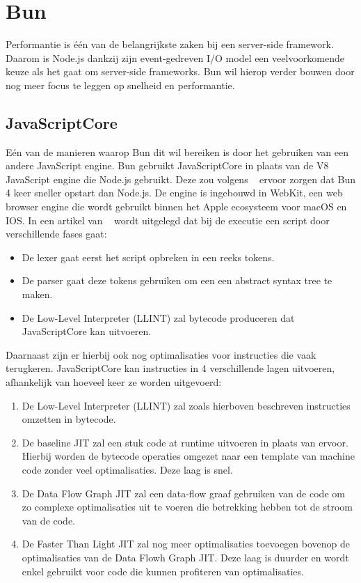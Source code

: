 \section{Bun}
Performantie is één van de belangrijkste zaken bij een server-side framework. 
Daarom is Node.js dankzij zijn event-gedreven I/O model een veelvoorkomende keuze als het gaat om server-side frameworks.
Bun wil hierop verder bouwen door nog meer focus te leggen op snelheid en performantie.


\subsection{JavaScriptCore}
Eén van de manieren waarop Bun dit wil bereiken is door het gebruiken van een andere JavaScript engine.
Bun gebruikt JavaScriptCore in plaats van de V8 JavaScript engine die Node.js gebruikt. 
Deze zou volgens ~\textcite{McDonnel2023} ervoor zorgen dat Bun 4 keer sneller opstart dan Node.js. 
De engine is ingebouwd in WebKit, een web browser engine die wordt gebruikt binnen het Apple ecosysteem voor macOS en IOS.
In een artikel van ~\textcite{Pizlo2020} wordt uitgelegd dat bij de executie een script door verschillende fases gaat:
\begin{itemize}
    \item De lexer gaat eerst het script opbreken in een reeks tokens.
    \item De parser gaat deze tokens gebruiken om een een abstract syntax tree te maken.
    \item De Low-Level Interpreter (LLINT) zal bytecode produceren dat JavaScriptCore kan uitvoeren.
\end{itemize}
Daarnaast zijn er hierbij ook nog optimalisaties voor instructies die vaak terugkeren. 
JavaScriptCore kan instructies in 4 verschillende lagen uitvoeren, afhankelijk van hoeveel keer ze worden uitgevoerd:
\begin{enumerate}
    \item De Low-Level Interpreter (LLINT) zal zoals hierboven beschreven instructies omzetten in bytecode.
    \item De baseline JIT zal een stuk code at runtime uitvoeren in plaats van ervoor. 
    Hierbij worden de bytecode operaties omgezet naar een template van machine code zonder veel optimalisaties. Deze laag is snel.
    \item De Data Flow Graph JIT zal een data-flow graaf gebruiken van de code om zo complexe optimalisaties uit te voeren die betrekking hebben tot de stroom van de code.
    \item De Faster Than Light JIT zal nog meer optimalisaties toevoegen bovenop de optimalisaties van de Data Flowh Graph JIT. 
    Deze laag is duurder en wordt enkel gebruikt voor code die kunnen profiteren van optimalisaties.
\end{enumerate}
